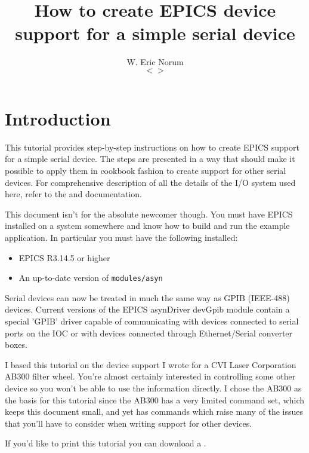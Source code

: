 \documentclass[twoside]{article}
\title{How to create EPICS device support for a simple serial device}
\author{W. Eric Norum \\ $<$\htmladdnormallink{norume@aps.anl.gov}{mailto:norume@aps.anl.gov}$>$}
\begin{document}
\begin{latexonly}
\maketitle
\tableofcontents
\cleardoublepage
{}
\end{latexonly}

\section{Introduction}
This tutorial provides step-by-step instructions on how to create
EPICS support for a simple serial device.
The steps are presented in a way that should make it possible to apply
them in
cookbook fashion to create support for other serial devices.
For comprehensive description of all the details of the I/O system
used here, refer to the
and
documentation.

This document isn't for the absolute newcomer though.  You must have
EPICS installed on a system somewhere and know how
to build and run the example application.
In particular you must have the following 
installed:
\begin{itemize}
\item EPICS R3.14.5 or higher
\item An up-to-date version of {\tt modules/asyn}
\end{itemize}
Serial devices can now be treated in much the
same way as GPIB (IEEE-488) devices.
Current versions of the EPICS asynDriver devGpib module contain
a special
'GPIB' driver capable of communicating with devices connected to serial
ports on the IOC or with devices connected through Ethernet/Serial converter
boxes.

I based this tutorial on the device support I wrote for a
CVI Laser Corporation AB300 filter wheel.
You're almost certainly interested in controlling some other device
so you won't be able to use the information directly.
I chose the AB300 as the basis for this tutorial since
the AB300 has a very limited command set, which keeps this document small,
and yet has commands which raise many
of the issues that you'll have to consider
when writing support for other devices.

\begin{htmlonly}
If you'd like to print this tutorial you can download a
.
\end{htmlonly}
\end{document}
